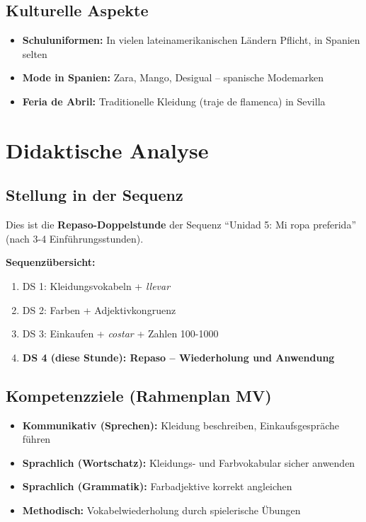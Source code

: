 \documentclass[11pt,a4paper]{article}
\newcommand{\reihenthema}{Unidad 5: Mi ropa preferida}
\begin{document}
\subsection{Kulturelle Aspekte}
\begin{itemize}
    \item \textbf{Schuluniformen:} In vielen lateinamerikanischen Ländern Pflicht, in Spanien selten
    \item \textbf{Mode in Spanien:} Zara, Mango, Desigual -- spanische Modemarken
    \item \textbf{Feria de Abril:} Traditionelle Kleidung (traje de flamenca) in Sevilla
\end{itemize}

\section{Didaktische Analyse}

\subsection{Stellung in der Sequenz}
Dies ist die \textbf{Repaso-Doppelstunde} der Sequenz ``\reihenthema'' (nach 3-4 Einführungsstunden).

\textbf{Sequenzübersicht:}
\begin{enumerate}
    \item DS 1: Kleidungsvokabeln + \textit{llevar}
    \item DS 2: Farben + Adjektivkongruenz
    \item DS 3: Einkaufen + \textit{costar} + Zahlen 100-1000
    \item \textbf{DS 4 (diese Stunde): Repaso -- Wiederholung und Anwendung}
\end{enumerate}

\subsection{Kompetenzziele (Rahmenplan MV)}
\begin{itemize}
    \item \textbf{Kommunikativ (Sprechen):} Kleidung beschreiben, Einkaufsgespräche führen
    \item \textbf{Sprachlich (Wortschatz):} Kleidungs- und Farbvokabular sicher anwenden
    \item \textbf{Sprachlich (Grammatik):} Farbadjektive korrekt angleichen
    \item \textbf{Methodisch:} Vokabelwiederholung durch spielerische Übungen
\end{itemize}
\end{document}
